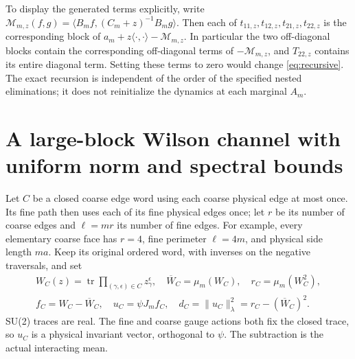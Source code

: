 \documentclass[11pt]{article}
\newcommand{\tr}{\operatorname{tr}}
\begin{document}
To display the generated terms explicitly, write
$\mathcal M_{m,z}(f,g)=\langle B_mf,(C_m+z)^{-1}B_mg\rangle$.
Then each of $t_{11,z},t_{12,z},t_{21,z},t_{22,z}$ is the corresponding
block of $a_m+z\langle\cdot,\cdot\rangle-\mathcal M_{m,z}$.
In particular the two off-diagonal blocks contain the corresponding
off-diagonal terms of $-\mathcal M_{m,z}$, and $T_{22,z}$ contains its
entire diagonal term. Setting these terms to zero would change
\eqref{eq:recursive}. The exact recursion is independent of the order of
the specified nested eliminations; it does not reinitialize the dynamics
at each marginal $A_m$.

\section{A large-block Wilson channel with uniform norm and spectral bounds}

Let $C$ be a closed coarse edge word using each coarse physical edge at
most once. Its fine path then uses each of its fine physical edges once;
let $r$ be its number of coarse edges and $\ell=mr$ its number of fine
edges. For example, every elementary coarse face has $r=4$, fine perimeter
$\ell=4m$, and physical side length $ma$. Keep its original ordered word,
with inverses on the negative traversals, and set
\begin{gather}
 W_C(z)=\tr\prod_{(\gamma,\epsilon)\in C}z_\gamma^\epsilon,\quad
 \overline W_C=\mu_m(W_C),\quad r_C=\mu_m(W_C^2),\nonumber\\
 f_C=W_C-\overline W_C,\quad u_C=\psi J_mf_C,\quad
 d_C=\|u_C\|_\lambda^2=r_C-(\overline W_C)^2.\label{eq:loop}
\end{gather}
SU(2) traces are real. The fine and coarse gauge actions both fix the
closed trace, so $u_C$ is a physical invariant vector, orthogonal to
$\psi$. The subtraction is the actual interacting mean.
\end{document}
